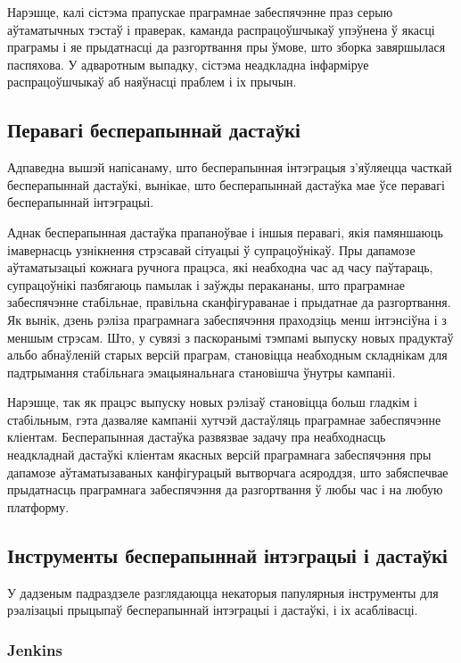 Нарэшце, калі сістэма прапускае праграмнае забеспячэнне
праз серыю аўтаматычных тэстаў і праверак, каманда распрацоўшчыкаў
упэўнена ў якасці праграмы і яе прыдатнасці да разгортвання
пры ўмове, што зборка завяршылася паспяхова.
У адваротным выпадку, сістэма неадкладна інфарміруе распрацоўшчыкаў
аб наяўнасці праблем і іх прычын.

\subsection{Перавагі бесперапыннай дастаўкі}

Адпаведна вышэй напісанаму, што бесперапынная інтэграцыя з'яўляецца
часткай бесперапыннай дастаўкі, вынікае, што бесперапыннай дастаўка
мае ўсе перавагі бесперапыннай інтэграцыі.

Аднак бесперапынная дастаўка прапаноўвае і іншыя перавагі, якія
памяншаюць іма\-вер\-насць узнікнення стрэсавай сітуацыі ў супрацоўнікаў.
Пры дапамозе аўтаматызацыі кожнага ручнога працэса, які неабходна
час ад часу паўтараць, супрацоўнікі пазбягаюць памылак і заўжды
перакананы, што праграмнае забеспячэнне стабільнае, правільна
сканфігураванае і прыдатнае да разгортвання.
Як вынік, дзень рэліза праграмнага забеспячэння праходзіць менш
інтэнсіўна і з меншым стрэсам.
Што, у сувязі з паскоранымі тэмпамі выпуску новых прадуктаў
альбо абнаўленій старых версій праграм, становіцца неабходным складнікам
для падтрымання стабільнага эмацыянальнага становішча ўнутры кампаніі.

Нарэшце, так як працэс выпуску новых рэлізаў становіцца больш гладкім і
стабільным, гэта дазваляе кампаніі хутчэй дастаўляць
праграмнае забеспячэнне кліентам.
Бесперапынная дастаўка развязвае задачу пра неабходнасць
неадкладнай дастаўкі кліентам якасных версій праграмнага забеспячэння
пры дапамозе аўтаматызаваных канфігурацый вытворчага асяроддзя, што
забяспечвае прыдатнасць праграмнага забеспячэння да разгортвання
ў любы час і на любую платформу.


\subsection{Інструменты бесперапыннай інтэграцыі і дастаўкі}

У дадзеным падраздзеле разглядаюцца некаторыя папулярныя інструменты для
рэалізацыі прыцыпаў бесперапыннай інтэграцыі і дастаўкі,
і іх асаблівасці.

\subsubsection{Jenkins}

